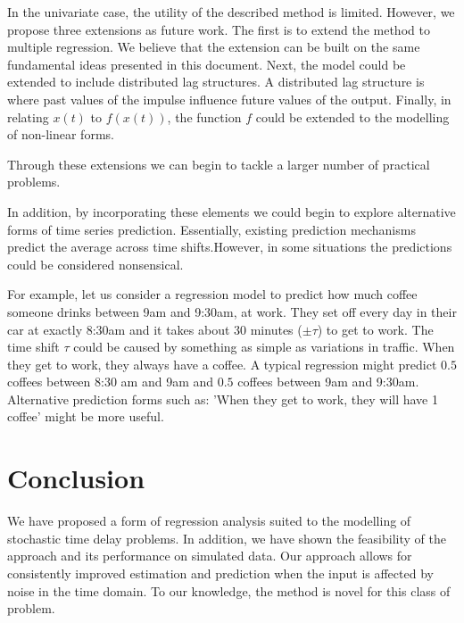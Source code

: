 \documentclass[11pt]{amsart}
\begin{document}
In the univariate case, the utility of the described method is limited. However, we propose three extensions as future work. The first is to extend the method to multiple regression. We believe that the extension can be built on the same fundamental ideas presented in this document. Next, the model could be extended to include distributed lag structures. A distributed lag structure is where past values of the impulse influence future values of the output. Finally, in relating $x(t)$ to $f(x(t))$, the function $f$ could be extended to the modelling of non-linear forms.

Through these extensions we can begin to tackle a larger number of practical problems.

In addition, by incorporating these elements we could begin to explore alternative forms of time series prediction. Essentially, existing prediction mechanisms predict the average across time shifts.However, in some situations the predictions could be considered nonsensical.

For example, let us consider a regression model to predict how much coffee someone drinks between 9am and 9:30am, at work. They set off every day in their car at exactly 8:30am and it takes about 30 minutes ($\pm \tau$) to get to work. The time shift $\tau$ could be caused by something as simple as variations in traffic. When they get to work, they always have a coffee. A typical regression might predict $0.5$ coffees between 8:30 am and 9am and $0.5$ coffees between 9am and 9:30am. Alternative prediction forms such as: 'When they get to work, they will have 1 coffee' might be more useful.


\section{Conclusion}

We have proposed a form of regression analysis suited to the modelling of stochastic time delay problems. In addition, we have shown the feasibility of the approach and its performance on simulated data. Our approach allows for consistently improved estimation and prediction when the input is affected by noise in the time domain. To our knowledge, the method is novel for this class of problem.




\end{document}
